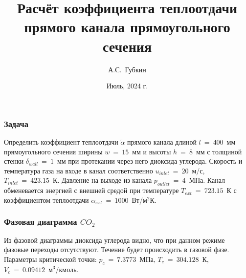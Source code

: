 \documentclass[10pt,xcolor={dvipsnames,table},aspectratio=169]{beamer}
\author[Губкин]{А.С.~Губкин}
\title[Расчёт коэффициента теплоотдачи прямого канала прямоугольного сечения]{Расчёт коэффициента теплоотдачи прямого канала прямоугольного сечения}
\date[Тюмень 2024]{Июль, 2024 г.}
\begin{document}
    \frame{\titlepage}

    \begin{frame}{}

        \justifying
        \normalsize

        \frametitle{Задача}

        Определить коэффициент теплоотдачи $ \tilde{\alpha} $ прямого канала длиной $ l~=~400$~мм прямоугольного сечения ширины $ w~=~15 $~мм и высоты $ h~=~8 $~мм с толщиной стенки $ \delta_{wall}~=~1 $~мм при протекании через него диоксида углерода. Скорость и температура газа на входе в канал соответственно $ u_{inlet}~=~20 $~м/с, $ T_{inlet}~=~423.15 $~К. Давление на выходе из канала $ p_{outlet}~=~4 $~МПа. Канал обменевается энергией с внешней средой при температуре $ T_{ext}~=~723.15 $~К с коэффициентом теплоотдачи $ \alpha_{ext}~=~1000 $~Вт/м$^2$К.

    \end{frame}

    \begin{frame}

        \justifying
        \normalsize

        \frametitle{Фазовая диаграмма $CO_{2}$}

        \begin{minipage}[b]{0.49\linewidth}
            Из фазовой диаграммы диоксида углерода видно, что при данном режиме фазовые переходы отсутствуют. Течение будет происходить в газовой фазе. \\

            Параметры критической точки: $ p_{c}~=~7.3773 $~МПа, $ T_{c}~=~304.128 $~К, $ V_{c}~=~0.09412 $~м$^{3}$/кмоль.
        \end{minipage}
        \hfill
        \begin{minipage}{0.49\linewidth}
            \begin{figure}
                \centering
                
            \end{figure}
        \end{minipage}

    \end{frame}
\end{document}
